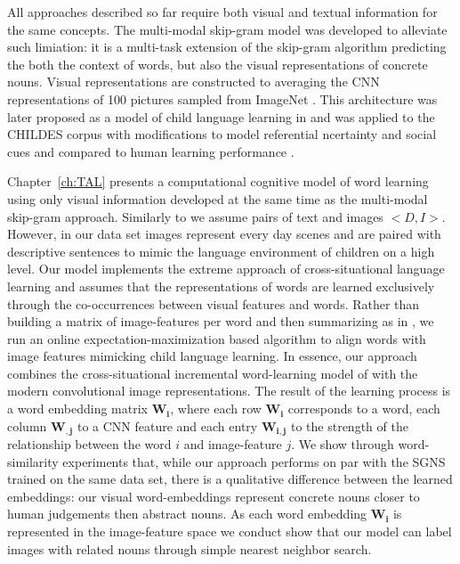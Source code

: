 All approaches described so far require both visual and textual information for the same concepts.
The multi-modal skip-gram \cite{lazaridou2015combining} model was developed to alleviate such limiation:
it is a multi-task extension of the skip-gram algorithm predicting the both the context of words, but also
the visual representations of concrete nouns. Visual representations are constructed to averaging
the CNN representations \cite{krizhevsky2012imagenet} of 100 pictures sampled from ImageNet \cite{deng2009imagenet}.
This architecture was later proposed as a model of child language learning in and
was applied to the CHILDES corpus \cite{macwhinney2014childes} with modifications to model referential
ncertainty and social cues \cite{lazaridou2016multimodal} and compared to human learning performance \cite{lazaridou2017multimodal}.



Chapter~\ref{ch:TAL} presents a computational cognitive model of word learning using only
visual information developed at the same time as the multi-modal skip-gram approach.
Similarly to \cite{feng2010visual} we assume pairs of text and images
$<D, I>$. However, in our data set images represent every day scenes and are paired with descriptive
sentences to mimic the language environment of children on a high level.
Our model implements the extreme approach of cross-situational language
learning and assumes that the representations of words are learned exclusively through the co-occurrences
between visual features and words. Rather than building a
matrix of image-features per word and then summarizing as in \cite{kiela2014learning},
we run an online expectation-maximization based \citep{dempster1977maximum} 
algorithm to align words with image features mimicking child language learning.
In essence, our approach combines the cross-situational incremental word-learning model
of \cite{fazly.etal.10csj} with the modern convolutional image representations.
The result of the learning process is a word embedding matrix $\mathbf{W_i}$,
where each row $\mathbf{W_i}$ corresponds to a word, each column $\mathbf{W_{,j}}$
to a CNN feature and each entry $\mathbf{W_{i,j}}$ to the strength
of the relationship between the word $i$ and image-feature $j$.
We show through word-similarity experiments that, while our approach performs on
par with the SGNS trained on the same data set, there is a qualitative difference between
the learned embeddings: our visual word-embeddings represent concrete nouns closer to human
judgements then abstract nouns. As each word embedding $\mathbf{W_i}$ is represented in the
image-feature space we conduct show that our model can label images with related nouns through
simple nearest neighbor search.


